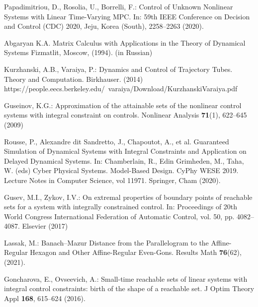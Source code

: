 \documentclass[../main.tex]{subfiles}
\begin{document}
\begin{thebibliography}{99}
Papadimitriou, D., Rosolia, U., Borrelli, F.: Control of Unknown Nonlinear Systems with Linear Time-Varying MPC. In: 59th IEEE Conference on Decision and Control (CDC) 2020, Jeju, Korea (South), 2258--2263 (2020). 


Abgaryan K.A. Matrix Calculus with Applications in the Theory of Dynamical Systems Fizmatlit, Moscow, (1994). (in Russian)

Kurzhanski, A.B., Varaiya, P.: Dynamics and Control of Trajectory Tubes. Theory and Computation. Birkhauser. (2014)\\ https://people.eecs.berkeley.edu/~varaiya/Download/KurzhanskiVaraiya.pdf

Guseinov, K.G.: Approximation of the attainable sets of the nonlinear control systems with integral constraint on controls. Nonlinear Analysis \textbf{71}(1), 622--645 (2009) 

Rousse, P., Alexandre dit Sandretto, J., Chapoutot, A., et al. Guaranteed Simulation of Dynamical Systems with Integral Constraints and Application on Delayed Dynamical Systems. In: Chamberlain, R., Edin Grimheden, M., Taha, W. (eds) Cyber Physical Systems. Model-Based Design. CyPhy WESE 2019. Lecture Notes in Computer Science, vol 11971. Springer, Cham (2020). 

Gusev, M.I., Zykov, I.V.: On extremal properties of boundary points of reachable sets for a system with integrally constrained control. In: Proceedings of 20th World Congress International Federation of Automatic Control, vol. 50, pp. 4082--4087. Elsevier (2017) 

Lassak, M.: Banach–Mazur Distance from the Parallelogram to the Affine-Regular Hexagon and Other Affine-Regular Even-Gons. Results Math \textbf{76}(62), (2021). 

Goncharova, E., Ovseevich, A.: Small-time reachable sets of linear systems with integral control constraints: birth of the shape of a reachable set. J Optim Theory Appl \textbf{168}, 615--624 (2016).


\end{thebibliography}
\end{document}
